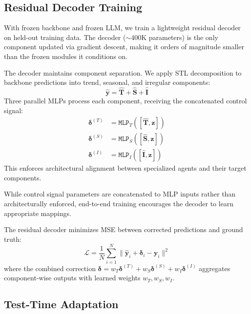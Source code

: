 

\subsection{Residual Decoder Training}

With frozen backbone and frozen LLM, we train a lightweight residual decoder on held-out training data. The decoder (${\sim}$400K parameters) is the only component updated via gradient descent, making it orders of magnitude smaller than the frozen modules it conditions on.




The decoder maintains component separation. We  apply STL decomposition to backbone predictions into trend, seasonal, and irregular components:
\begin{equation}
    \hat{\mathbf{y}} = \hat{\mathbf{T}} + \hat{\mathbf{S}} + \hat{\mathbf{I}}
\end{equation}
Three parallel MLPs process each component, receiving the concatenated control signal:
\begin{align}
    \boldsymbol{\delta}^{(T)} &= \texttt{MLP}_T([\hat{\mathbf{T}}, \mathbf{z}]) \\
    \boldsymbol{\delta}^{(S)} &= \texttt{MLP}_S([\hat{\mathbf{S}}, \mathbf{z}]) \\
    \boldsymbol{\delta}^{(I)} &= \texttt{MLP}_I([\hat{\mathbf{I}}, \mathbf{z}])
\end{align}
This enforces architectural alignment between specialized agents and their target components.


While control signal parameters are concatenated to MLP inputs rather than architecturally enforced, end-to-end training encourages the decoder to learn appropriate mappings. 

The residual decoder minimizes MSE between corrected predictions and ground truth:
\begin{equation}
    \mathcal{L} = \frac{1}{N}\sum_{i=1}^{N} \lVert \hat{\mathbf{y}}_i + \boldsymbol{\delta}_i - \mathbf{y}_i \rVert^2
\end{equation}
where the combined correction $\boldsymbol{\delta} = w_T \boldsymbol{\delta}^{(T)} + w_S \boldsymbol{\delta}^{(S)} + w_I \boldsymbol{\delta}^{(I)}$ aggregates component-wise outputs with learned weights $w_T, w_S, w_I$. 


\subsection{Test-Time Adaptation}


